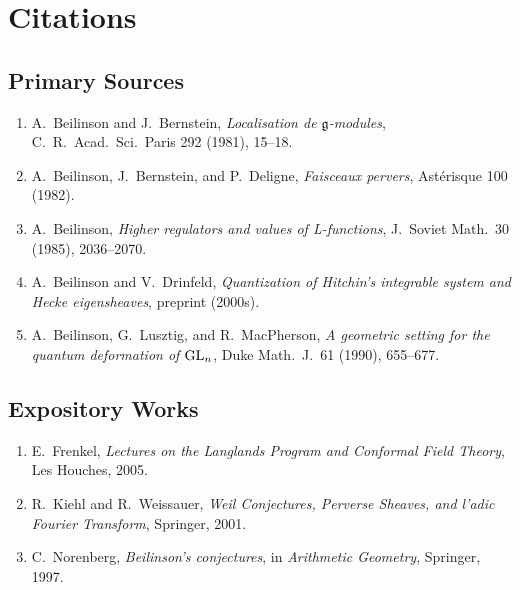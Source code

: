 \section{Citations}\subsection*{Primary Sources}
\begin{enumerate}
    \item A.\ Beilinson and J.\ Bernstein, \textit{Localisation de $\mathfrak{g}$-modules}, C.\ R.\ Acad.\ Sci.\ Paris 292 (1981), 15--18.
    \item A.\ Beilinson, J.\ Bernstein, and P.\ Deligne, \textit{Faisceaux pervers}, Ast\'erisque 100 (1982).
    \item A.\ Beilinson, \textit{Higher regulators and values of L-functions}, J.\ Soviet Math.\ 30 (1985), 2036--2070.
    \item A.\ Beilinson and V.\ Drinfeld, \textit{Quantization of Hitchin's integrable system and Hecke eigensheaves}, preprint (2000s).
    \item A.\ Beilinson, G.\ Lusztig, and R.\ MacPherson, \textit{A geometric setting for the quantum deformation of $\operatorname{GL}_n$}, Duke Math.\ J.\ 61 (1990), 655--677.
\end{enumerate}

\subsection*{Expository Works}
\begin{enumerate}
    \item E.\ Frenkel, \textit{Lectures on the Langlands Program and Conformal Field Theory}, Les Houches, 2005.
    \item R.\ Kiehl and R.\ Weissauer, \textit{Weil Conjectures, Perverse Sheaves, and l'adic Fourier Transform}, Springer, 2001.
    \item C.\ Norenberg, \textit{Beilinson's conjectures}, in \textit{Arithmetic Geometry}, Springer, 1997.
\end{enumerate}

